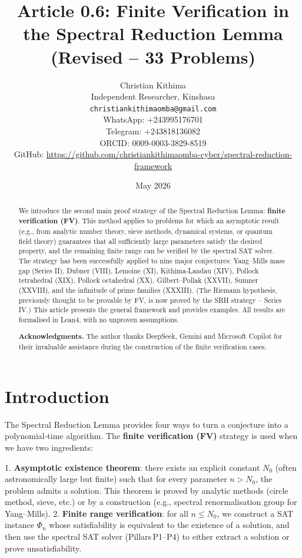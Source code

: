\documentclass[11pt,a4paper]{article}
\title{Article 0.6: Finite Verification in the Spectral Reduction Lemma (Revised – 33 Problems)}
\author{Christian Kithima \\
Independent Researcher, Kinshasa \\
\texttt{christiankithimaomba@gmail.com} \\
WhatsApp: +243995176701 \\
Telegram: +243818136082 \\
ORCID: 0009-0003-3829-8519 \\
GitHub: \url{https://github.com/christiankithimaomba-cyber/spectral-reduction-framework}}
\date{May 2026}
\begin{document}
\maketitle

\begin{abstract}
We introduce the second main proof strategy of the Spectral Reduction Lemma: \textbf{finite verification (FV)}. This method applies to problems for which an asymptotic result (e.g., from analytic number theory, sieve methods, dynamical systems, or quantum field theory) guarantees that all sufficiently large parameters satisfy the desired property, and the remaining finite range can be verified by the spectral SAT solver. The strategy has been successfully applied to nine major conjectures: Yang–Mills mass gap (Series II), Dubner (VIII), Lemoine (XI), Kithima‑Landau (XIV), Pollock tetrahedral (XIX), Pollock octahedral (XX), Gilbert–Pollak (XXVII), Sumner (XXVIII), and the infinitude of prime families (XXXIII). (The Riemann hypothesis, previously thought to be provable by FV, is now proved by the SRH strategy – Series IV.) This article presents the general framework and provides examples. All results are formalised in Lean4, with no unproven assumptions.

\textbf{Acknowledgments.} The author thanks DeepSeek, Gemini and Microsoft Copilot for their invaluable assistance during the construction of the finite verification cases.
\end{abstract}

\tableofcontents

\section{Introduction}

The Spectral Reduction Lemma provides four ways to turn a conjecture into a polynomial‑time algorithm. The \textbf{finite verification (FV)} strategy is used when we have two ingredients:

1. \textbf{Asymptotic existence theorem}: there exists an explicit constant \(N_0\) (often astronomically large but finite) such that for every parameter \(n > N_0\), the problem admits a solution. This theorem is proved by analytic methods (circle method, sieve, etc.) or by a construction (e.g., spectral renormalisation group for Yang–Mills).
2. \textbf{Finite range verification}: for all \(n \le N_0\), we construct a SAT instance \(\Phi_n\) whose satisfiability is equivalent to the existence of a solution, and then use the spectral SAT solver (Pillars P1–P4) to either extract a solution or prove unsatisfiability.
\end{document}
